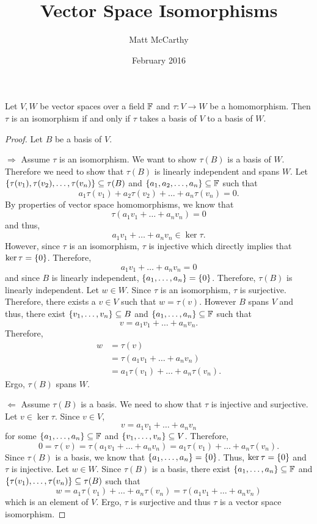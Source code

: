 \documentclass[notitlepage]{simple}
\author{Matt McCarthy}
\title{Vector Space Isomorphisms}
\date{February 2016}
\begin{document}
	\maketitle

	\begin{thm}
		Let $V,W$ be vector spaces over a field $\mathbb{F}$ and $\tau: V\rightarrow W$ be a homomorphism.
		Then $\tau$ is an isomorphism if and only if $\tau$ takes a basis of $V$ to a basis of $W$.
	\end{thm}
	\begin{proof}
		Let $B$ be a basis of $V$.

		$\Rightarrow$ Assume $\tau$ is an isomorphism.
		We want to show $\tau(B)$ is a basis of $W$.
		Therefore we need to show that $\tau(B)$ is linearly independent and spans $W$.
		Let $\lbrace \tau(v_1),\tau(v_2),\ldots,\tau(v_n) \rbrace\subseteq\tau(B)$ and $\lbrace a_1,a_2,\ldots,a_n \rbrace\subseteq\mathbb{F}$ such that
		\[
			a_1\tau(v_1)+a_2\tau(v_2)+\ldots+a_n\tau(v_n)=0.
		\]
		By properties of vector space homomorphisms, we know that
		\[
			\tau(a_1v_1+\ldots+a_nv_n)=0
		\]
		and thus,
		\[
			a_1v_1+\ldots +a_nv_n\in\ker\tau.
		\]
		However, since $\tau$ is an isomorphism, $\tau$ is injective which directly implies that $\ker\tau=\lbrace 0 \rbrace$.
		Therefore,
		\[
			a_1v_1+\ldots +a_nv_n = 0
		\]
		and since $B$ is linearly independent, $\lbrace a_1,\ldots,a_n \rbrace=\lbrace 0 \rbrace$.
		Therefore, $\tau(B)$ is linearly independent.
		Let $w\in W$.
		Since $\tau$ is an isomorphism, $\tau$ is surjective.
		Therefore, there exists a $v\in V$ such that $w=\tau(v)$.
		However $B$ spans $V$ and thus, there exist $\lbrace v_1,\ldots,v_n \rbrace\subseteq B$ and $\lbrace a_1,\ldots,a_n \rbrace\subseteq\mathbb{F}$ such that
		\[
			v=a_1v_1+\ldots+a_nv_n.
		\]
		Therefore,
		\begin{align*}
			w &= \tau(v)\\
			&=\tau(a_1v_1+\ldots+a_nv_n)\\
			&=a_1\tau(v_1)+\ldots +a_n\tau(v_n).
		\end{align*}
		Ergo, $\tau(B)$ spans $W$.

		$\Leftarrow$ Assume $\tau(B)$ is a basis.
		We need to show that $\tau$ is injective and surjective.
		Let $v\in\ker\tau$.
		Since $v\in V$,
		\[
			v=a_1v_1+\ldots+a_nv_n
		\]
		for some $\lbrace a_1,\ldots,a_n \rbrace\subseteq\mathbb{F}$ and $\lbrace v_1,\ldots,v_n \rbrace\subseteq V$.
		Therefore,
		\[
			0 = \tau(v)=\tau(a_1v_1+\ldots+a_nv_n)=a_1\tau(v_1)+\ldots+a_n\tau(v_n).
		\]
		Since $\tau(B)$ is a basis, we know that $\lbrace a_1,\ldots,a_n \rbrace=\lbrace 0 \rbrace$.
		Thus, $\ker\tau=\lbrace 0 \rbrace$ and $\tau$ is injective.
		Let $w\in W$.
		Since $\tau(B)$ is a basis, there exist $\lbrace a_1,\ldots,a_n \rbrace\subseteq\mathbb{F}$ and $\lbrace \tau(v_1),\ldots,\tau(v_n) \rbrace\subseteq \tau(B)$ such that
		\[
			w=a_1\tau(v_1)+\ldots +a_n\tau(v_n)=\tau(a_1v_1+\ldots+a_nv_n)
		\]
		which is an element of $V$.
		Ergo, $\tau$ is surjective and thus $\tau$ is a vector space isomorphism.
	\end{proof}
\end{document}
